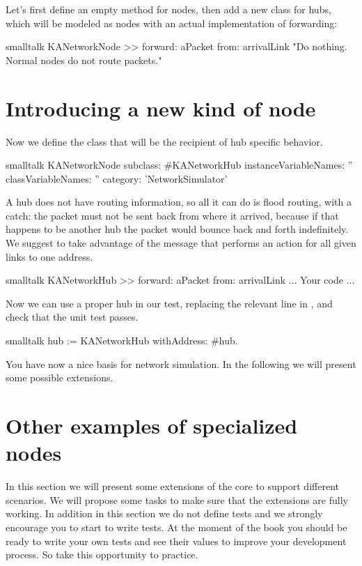 \documentclass[10pt,twoside,english]{_support/latex/sbabook/sbabook}
\begin{document}
Let's first define an empty  method for nodes, then add a new class for hubs, which will be modeled as nodes with an actual implementation of forwarding:

\begin{displaycode}{smalltalk}
KANetworkNode >> forward: aPacket from: arrivalLink
    "Do nothing. Normal nodes do not route packets."
\end{displaycode}
\section{Introducing a new kind of node}
Now we define the class  that will be the recipient of hub specific behavior. 

\begin{displaycode}{smalltalk}
KANetworkNode subclass: #KANetworkHub
    instanceVariableNames: ''
    classVariableNames: ''
    category: 'NetworkSimulator'
\end{displaycode}

A hub does not have routing information, so all it can do is flood routing, with a catch: the packet must not be sent back from where it arrived, because if that happens to be another hub the packet would bounce back and forth indefinitely. We suggest to take advantage of the message  that performs an action for all given links to one address.

\begin{displaycode}{smalltalk}
KANetworkHub >> forward: aPacket from: arrivalLink
   ... Your code ...
\end{displaycode}

Now we can use a proper hub in our test, replacing the relevant line in , and check that the  unit test passes.

\begin{displaycode}{smalltalk}
    hub := KANetworkHub withAddress: #hub.
\end{displaycode}

You have now a nice basis for network simulation. In the following we will present some possible extensions. 
\section{Other examples of specialized nodes}
In this section we will present some extensions of the core to support different scenarios. We will propose some tasks to make sure that the extensions are fully working. In addition in this section we do not define tests and we strongly encourage you to start to write tests. At the moment of the book you should be ready to write your own tests and see their values to improve your development process. So take this opportunity to practice.
\end{document}
